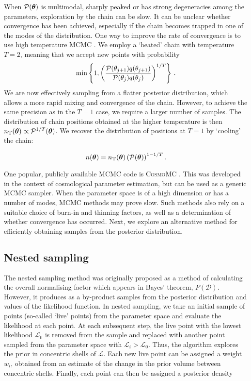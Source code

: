 When $\mathcal{P}(\boldsymbol\theta)$ is multimodal, sharply peaked or has strong degeneracies among the parameters, exploration by the chain can be slow. It can be unclear whether convergence has been achieved, especially if the chain becomes trapped in one of the modes of the distribution. One way to improve the rate of convergence is to use high temperature MCMC \cite{Kirkpatrick:1983,Lewis:2009}. We employ a `heated' chain with temperature $T = 2$, meaning that we accept new points with probability
\begin{equation}
\textrm{min}\left\{1, \left(\frac{\mathcal{P}(\bold\theta_{j+1})q(\bold\theta_{j+1})}{\mathcal{P}(\bold\theta_{j})q(\bold\theta_{j})}\right)^{1/T} \right\}\,.
\end{equation}
We are now effectively sampling from a flatter posterior distribution, which allows a more rapid mixing and convergence of the chain. However, to achieve the same precision as in the $T=1$ case, we require a larger number of samples. The distribution of chain positions obtained at the higher temperature is then \(n_\textrm{T}(\boldsymbol\theta) \propto \mathcal{P}^{1/T}(\boldsymbol\theta)\). We recover the distribution of positions at \(T=1\) by `cooling' the chain:

\begin{equation}
n(\boldsymbol\theta) = n_\textrm{T}(\boldsymbol\theta) \left(\mathcal{P}(\boldsymbol\theta)\right)^{1 - 1/T}.
\end{equation}


One popular, publicly available MCMC code is \textsc{CosmoMC} \cite{Lewis:2002}. This was developed in the context of cosmological parameter estimation, but can be used as a generic MCMC sampler. When the parameter space is of a high dimension or has a number of modes, MCMC methods may prove slow. Such methods also rely on a suitable choice of burn-in and thinning factors, as well as a determination of whether convergence has occurred. Next, we explore an alternative method for efficiently obtaining samples from the posterior distribution.

\subsection{Nested sampling}

The nested sampling method \cite{Skilling:2004} was originally proposed as a method of calculating the overall normalising factor which appears in Bayes' theorem, $P(\mathcal{D})$. However, it produces as a by-product samples from the posterior distribution and values of the likelihood function. In nested sampling, we take an initial sample of points (so-called `live' points) from the parameter space and evaluate the likelihood at each point. At each subsequent step, the live point with the lowest likelihood $\mathcal{L}_0$ is removed from the sample and replaced with another point sampled from the parameter space with $\mathcal{L}_i > \mathcal{L}_0$. Thus, the algorithm explores the prior in concentric shells of $\mathcal{L}$. Each new live point can be assigned a weight $w_i$, obtained from an estimate of the change in the prior volume between concentric shells. Finally, each point can then be assigned a posterior density

